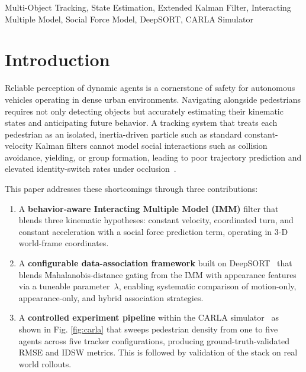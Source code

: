 \documentclass[conference]{IEEEtran}
\begin{document}
\begin{IEEEkeywords}
Multi-Object Tracking, State Estimation, Extended Kalman Filter, Interacting Multiple Model, Social Force Model, DeepSORT, CARLA Simulator
\end{IEEEkeywords}

\section{Introduction}
\label{sec:intro}

Reliable perception of dynamic agents is a cornerstone of safety for autonomous vehicles operating in dense urban environments. Navigating alongside pedestrians requires not only detecting objects but accurately estimating their kinematic states and anticipating future behavior. A tracking system that treats each pedestrian as an isolated, inertia-driven particle such as standard constant-velocity Kalman filters cannot model social interactions such as collision avoidance, yielding, or group formation, leading to poor trajectory prediction and elevated identity-switch rates under occlusion~\cite{lefevre2014survey}.

This paper addresses these shortcomings through three contributions:
\begin{enumerate}
    \item A \textbf{behavior-aware Interacting Multiple Model (IMM)} filter that blends three kinematic hypotheses: constant velocity, coordinated turn, and constant acceleration with a social force prediction term, operating in 3-D world-frame coordinates.
    \item A \textbf{configurable data-association framework} built on DeepSORT~\cite{wojke2017simple} that blends Mahalanobis-distance gating from the IMM with appearance features via a tuneable parameter~$\lambda$, enabling systematic comparison of motion-only, appearance-only, and hybrid association strategies.
    \item A \textbf{controlled experiment pipeline} within the CARLA simulator~\cite{dosovitskiy2017carla} as shown in Fig. \ref{fig:carla} that sweeps pedestrian density from one to five agents across five tracker configurations, producing ground-truth-validated RMSE and IDSW metrics. This is followed by validation of the stack on real world rollouts. 
    
\end{enumerate}
\end{document}
